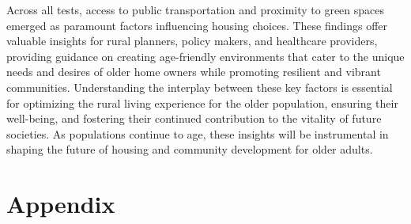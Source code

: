 \documentclass[3p,11pt ]{elsarticle}
\begin{document}
Across all tests, access to public transportation and proximity to green spaces emerged as paramount factors influencing housing choices. These findings offer valuable insights for rural planners, policy makers, and healthcare providers, providing guidance on creating age-friendly environments that cater to the unique needs and desires of older home owners while promoting resilient and vibrant communities. Understanding the interplay between these key factors is essential for optimizing the rural living experience for the older population, ensuring their well-being, and fostering their continued contribution to the vitality of future societies. As populations continue to age, these insights will be instrumental in shaping the future of housing and community development for older adults.

\newpage

\section{Appendix}











\clearpage


\pagebreak




\end{document}
